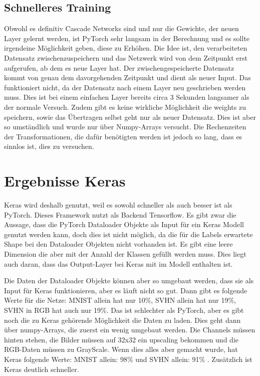 \subsection{Schnelleres Training}
    Obwohl es definitiv Cascade Networks sind und nur die Gewichte, der neuen Layer gelernt 
    werden, ist PyTorch sehr langsam in der Berechnung und es sollte irgendeine Möglichkeit 
    geben, diese zu Erhöhen.
    Die Idee ist, den verarbeiteten Datensatz zwischenzuspeichern und das Netzwerk wird von dem Zeitpunkt 
    erst aufgerufen, ab dem es neue Layer hat. Der zwischengespeicherte Datensatz kommt 
    von genau dem davorgehenden Zeitpunkt und dient als neuer Input. Das funktioniert nicht, 
    da der Datensatz nach einem Layer neu geschrieben werden muss. Dies ist bei einem 
    einfachen Layer bereits circa 3 Sekunden langsamer als der normale Versuch. Zudem gibt 
    es keine wirkliche Möglichkeit die weights zu speichern, sowie das Übertragen selbst 
    geht nur als neuer Datensatz. Dies ist aber so umständlich und wurde nur über Numpy-Arrays versucht. 
    Die Rechenzeiten der Transformationen, die dafür benötigten werden ist jedoch so lang, dass es 
    sinnlos ist, dies zu versuchen.


\section{Ergebnisse Keras}
    Keras wird deshalb genutzt, weil es sowohl schneller als auch besser ist als PyTorch. 
    Dieses Framework nutzt als Backend Tensorflow.
    Es gibt zwar die Aussage, dass die PyTorch Dataloader Objekte als Input für ein 
    Keras Modell genutzt werden kann, doch dies ist nicht möglich, da die für die Labels 
    erwartete Shape bei den Dataloader Objekten nicht vorhanden ist. Es gibt eine leere 
    Dimension die aber mit der Anzahl der Klassen gefüllt werden muss. 
    Dies liegt auch daran, dass das Output-Layer bei Keras mit im Modell enthalten ist. 

    Die Daten der Dataloader Objekte können aber so umgebaut werden, dass sie als Input 
    für Keras funktionieren, aber es läuft nicht so gut. Dann gibt es folgende Werte für die Netze: 
    MNIST allein hat nur 10\%, SVHN allein hat nur 19\%, SVHN in RGB hat auch nur 19\%. 
    Das ist schlechter als PyTorch, aber es gibt noch die zu Keras gehörende Möglichkeit die 
    Daten zu laden. Dies geht dann über numpy-Arrays, die zuerst ein wenig umgebaut werden. 
    Die Channels müssen hinten stehen, die Bilder müssen auf 32x32 ein upscaling bekommen und 
    die RGB-Daten müssen zu GrayScale. Wenn dies alles aber gemacht wurde, hat Keras folgende Werte: 
    MNIST allein: 98\% \cite{MNIST_Network} und SVHN allein: 91\% \cite{SVHN_Network}. 
    Zusätzlich ist Keras deutlich schneller. 

